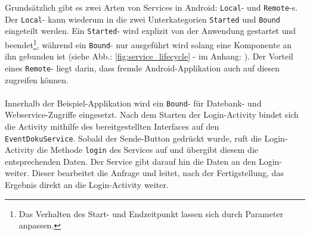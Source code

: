 \documentclass[Bachelorarbeit.tex]{subfiles}
\begin{document}
Grundsätzlich gibt es zwei Arten von Services in Android: \texttt{Local}- und \texttt{Remote}-s.
Der \texttt{Local}- kann wiederum in die zwei Unterkategorien \texttt{Started}  und \texttt{Bound} eingeteilt werden.
Ein \texttt{Started}- wird explizit von der Anwendung gestartet und beendet\footnote{Das Verhalten des Start- und Endzeitpunkt lassen sich durch Parameter anpassen.}, während ein \texttt{Bound}- nur ausgeführt wird solang eine Komponente an ihn gebunden ist (siehe Abb.: \ref{fig:service_lifecycle} -  im Anhang: ).  
Der Vorteil eines \texttt{Remote}- liegt darin, dass fremde Android-Applikation auch auf diesen zugreifen können.
\parencites()()[vgl.:][]{android_service}[sowie:][ab Seite: 409ff]{android_proAndroid4}\\
\\
Innerhalb der Beispiel-Applikation wird ein \texttt{Bound}- für Datebank- und Webservice-Zugriffe eingesetzt. 
Nach dem Starten der Login-Activity bindet sich die Activity mithilfe des bereitgestellten Interfaces auf den\\ \texttt{EventDokuService}.
Sobald der Sende-Button gedrückt wurde, ruft die Login-Activity die Methode \texttt{login} des Services auf und übergibt diesem die entsprechenden Daten.  
Der Service gibt darauf hin die Daten an den Login- weiter.
Dieser bearbeitet die Anfrage und leitet, nach der Fertigstellung, das Ergebnis direkt an die Login-Activity weiter.
\end{document}
